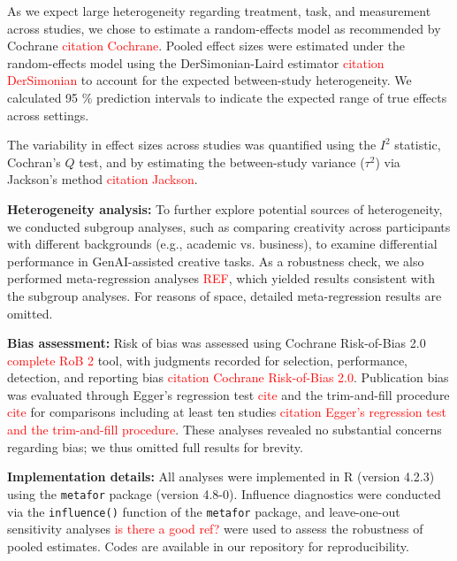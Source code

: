 \documentclass[manuscript, screen, review, acmsmall, anonymous]{acmart}
\newcommand{\TODO}[1]{\textcolor{red}{#1}}
\begin{document}
As we expect large heterogeneity regarding treatment, task, and measurement across studies, we chose to estimate a random-effects model as recommended by Cochrane \TODO{citation Cochrane}. Pooled effect sizes were estimated under the random-effects model using the DerSimonian-Laird estimator \cite{DerSimonian1986}\TODO{citation DerSimonian} to account for the expected between-study heterogeneity. We calculated 95 \% prediction intervals to indicate the expected range of true effects across settings. 


The variability in effect sizes across studies was quantified using the $I^2$ statistic, Cochran's $Q$ test, and by estimating the between-study variance ($\tau^2$) via Jackson's method \TODO{citation Jackson}. 

\textbf{Heterogeneity analysis:} To further explore potential sources of heterogeneity, we conducted subgroup analyses, such as comparing creativity across participants with different backgrounds (e.g., academic vs. business), to examine differential performance in GenAI-assisted creative tasks. As a robustness check, we also performed meta-regression analyses \TODO{REF}, which yielded results consistent with the subgroup analyses. For reasons of space, detailed meta-regression results are omitted.

\textbf{Bias assessment:} Risk of bias was assessed using Cochrane Risk-of-Bias 2.0 \TODO{complete RoB 2} tool, with judgments recorded for selection, performance, detection, and reporting bias \TODO{citation Cochrane Risk-of-Bias 2.0}. Publication bias was evaluated through Egger's regression test \TODO{cite} and the trim-and-fill procedure \TODO{cite} for comparisons including at least ten studies \TODO{citation Egger's regression test and the trim-and-fill procedure}. These analyses revealed no substantial concerns regarding bias; we thus omitted full results for brevity.



\textbf{Implementation details:} All analyses were implemented in R (version 4.2.3) using the \texttt{metafor} package (version 4.8-0). Influence diagnostics were conducted via the \texttt{influence()} function of the \texttt{metafor} package, and leave-one-out sensitivity analyses \TODO{is there a good ref?} were used to assess the robustness of pooled estimates. Codes are available in our repository for reproducibility. 
\end{document}
